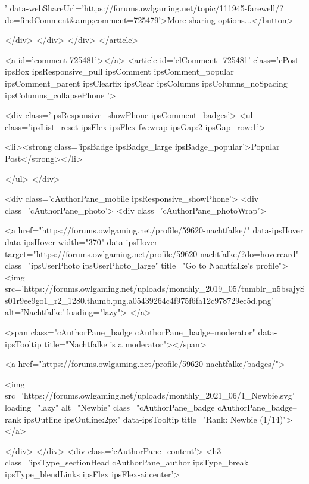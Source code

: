 ' data-webShareUrl='https://forums.owlgaming.net/topic/111945-farewell/?do=findComment&amp;comment=725479'>More sharing options...</button>

	
</div>
</div>
	</div>
</article>
					
				
					
					
					



<a id='comment-725481'></a>
<article  id='elComment_725481' class='cPost ipsBox ipsResponsive_pull  ipsComment ipsComment_popular ipsComment_parent ipsClearfix ipsClear ipsColumns ipsColumns_noSpacing ipsColumns_collapsePhone    '>
	

	
		<div class='ipsResponsive_showPhone ipsComment_badges'>
			<ul class='ipsList_reset ipsFlex ipsFlex-fw:wrap ipsGap:2 ipsGap_row:1'>
				
				
				
				
					<li><strong class='ipsBadge ipsBadge_large ipsBadge_popular'>Popular Post</strong></li>
				
			</ul>
		</div>
	

	<div class='cAuthorPane_mobile ipsResponsive_showPhone'>
		<div class='cAuthorPane_photo'>
			<div class='cAuthorPane_photoWrap'>
				


	<a href="https://forums.owlgaming.net/profile/59620-nachtfalke/" data-ipsHover data-ipsHover-width="370" data-ipsHover-target="https://forums.owlgaming.net/profile/59620-nachtfalke/?do=hovercard" class="ipsUserPhoto ipsUserPhoto_large" title="Go to Nachtfalke's profile">
		<img src='https://forums.owlgaming.net/uploads/monthly_2019_05/tumblr_n5bsajySs01r9ee9go1_r2_1280.thumb.png.a05439264c4f975f6fa12c978729ec5d.png' alt='Nachtfalke' loading="lazy">
	</a>

				
				<span class="cAuthorPane_badge cAuthorPane_badge--moderator" data-ipsTooltip title="Nachtfalke is a moderator"></span>
				
				
					<a href="https://forums.owlgaming.net/profile/59620-nachtfalke/badges/">
						
<img src='https://forums.owlgaming.net/uploads/monthly_2021_06/1_Newbie.svg' loading="lazy" alt="Newbie" class="cAuthorPane_badge cAuthorPane_badge--rank ipsOutline ipsOutline:2px" data-ipsTooltip title="Rank: Newbie (1/14)">
					</a>
				
			</div>
		</div>
		<div class='cAuthorPane_content'>
			<h3 class='ipsType_sectionHead cAuthorPane_author ipsType_break ipsType_blendLinks ipsFlex ipsFlex-ai:center'>
				


